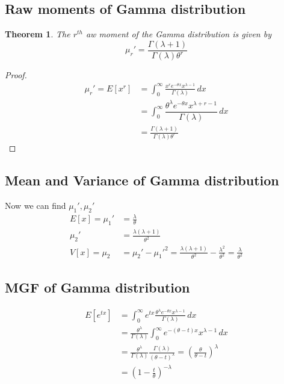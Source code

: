 \documentclass[oneside,11pt,pdftex]{book}%
\numberwithin{equation}{section}
\newtheorem{theorem}{Theorem}[chapter]%
\numberwithin{section}{chapter}
\numberwithin{equation}{chapter}
\begin{document}
\subsection{Raw moments of Gamma distribution}
\begin{theorem}
	The $ r^{th} $ aw moment of the Gamma distribution is given by \[\mu_r'=\frac{\Gamma(\lambda+1)}{\Gamma(\lambda)\theta^r} \]
\end{theorem}
\begin{proof}
	\begin{align*}
		\mu_r'=E[x^r]&=\int_0^\infty \frac{x^r e^{-\theta x} x^{\lambda -1}}{\Gamma(\lambda)}\, dx\\
		&=\int_0^{\infty} \dfrac{\theta^{\lambda} e^{-\theta x}x^{\lambda+r-1}  }{\Gamma(\lambda)}\, dx\\
		&= \frac{\Gamma(\lambda+1)}{\Gamma(\lambda) \theta^r}
	\end{align*}
\end{proof}

\subsection{Mean and Variance of Gamma distribution}
Now we can find $ \mu_1', \mu_2' $
\begin{align*}
	E[x]= \mu_1'&=\frac{\lambda}{\theta}\\
	\mu_2'&= \frac{\lambda(\lambda+1)}{\theta^2}\\
	V[x] = \mu_2 &=\mu_2'-\mu_1'^2=\frac{\lambda(\lambda +1)}{\theta^2}-\frac{\lambda^2}{\theta^2}=\frac{\lambda}{\theta^2}
\end{align*}

\subsection{MGF of Gamma distribution}
\begin{align*}
	 E[e^{tx}]&=\int_0^{\infty} e^{tx} \frac{\theta^\lambda e^{-\theta x} x^{\lambda -1}}{\Gamma(\lambda )}\, dx\\
	 &= \frac{\theta^{\lambda}}{\Gamma (\lambda)} \int_0^{\infty} e^{-(\theta - t) x}x^{\lambda -1}\, dx\\
	 &= \frac{\theta^\lambda}{\Gamma(\lambda )} \frac{\Gamma(\lambda )}{(\theta -t )^{\lambda}}=\left( \frac{\theta}{\theta - t}\right)^\lambda\\
	 &=\left(1- \frac{t}{\theta}\right)^{- \lambda}
\end{align*}
\end{document}

